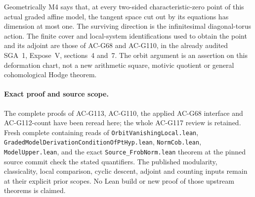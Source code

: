 Geometrically M4 says that, at every two-sided characteristic-zero
point of this actual graded affine model, the tangent space cut
out by its equations has dimension at most one.  The surviving
direction is the infinitesimal diagonal-torus action.  The finite
cover and local-system identifications used to obtain the point
and its adjoint are those of AC-G68 and AC-G110, in the already
audited SGA~1, Expose~V, sections~4 and~7.  The orbit argument is
an assertion on this deformation chart, not a new arithmetic
square, motivic quotient or general cohomological Hodge theorem.

\paragraph{Exact proof and source scope.}
The complete proofs of AC-G113, AC-G110, the applied AC-G68
interface and AC-G112-count have been reread here; the whole
AC-G117 review is retained.  Fresh complete containing reads of
\texttt{OrbitVanishingLocal.lean},
\texttt{GradedModelDerivationCondition\allowbreak OfPtHyp.lean},
\texttt{NormCob.lean}, \texttt{ModelUpper.lean}, and the exact
\texttt{Source\_FrobNorm.lean} theorem at the pinned source
commit check the stated quantifiers.  The published modularity,
classicality, local comparison, cyclic descent, adjoint and
counting inputs remain at their explicit prior scopes.  No Lean
build or new proof of those upstream theorems is claimed.
